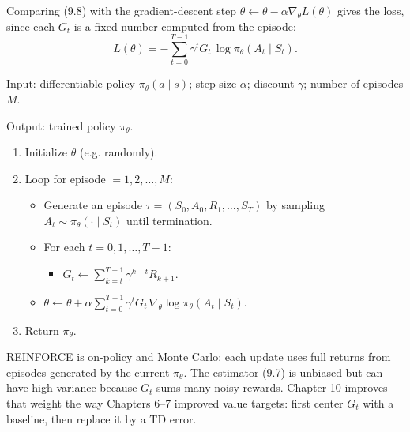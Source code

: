 Comparing (9.8) with the gradient-descent step $\theta\leftarrow\theta-\alpha\nabla_\theta L(\theta)$ gives the loss, since each $G_t$ is a fixed number computed from the episode: \begin{equation}
L(\theta)
=
-\sum_{t=0}^{T-1}
\gamma^{t}G_t\,\log\pi_\theta(A_t\mid S_t).
\tag{9.9}
\end{equation}

\begin{implnote}
Input: differentiable policy $\pi_\theta(a\mid s)$; step size $\alpha$; discount $\gamma$; number of episodes $M$.

Output: trained policy $\pi_\theta$.

\begin{enumerate}
\item Initialize $\theta$ (e.g. randomly).
\item Loop for episode $=1,2,\ldots,M$:
\begin{itemize}
\item Generate an episode $\tau=(S_0,A_0,R_1,\ldots,S_T)$ by sampling $A_t\sim\pi_\theta(\cdot\mid S_t)$ until termination.
\item For each $t=0,1,\ldots,T-1$:
\begin{itemize}
\item $G_t\leftarrow\sum_{k=t}^{T-1}\gamma^{k-t}R_{k+1}$.
\end{itemize}
\item $\theta\leftarrow\theta+\alpha\sum_{t=0}^{T-1}\gamma^{t}G_t\,\nabla_\theta\log\pi_\theta(A_t\mid S_t)$.
\end{itemize}
\item Return $\pi_\theta$.
\end{enumerate}

\end{implnote}




REINFORCE is on-policy and Monte Carlo: each update uses full returns from episodes generated by the current $\pi_\theta$. The estimator (9.7) is unbiased but can have high variance because $G_t$ sums many noisy rewards. Chapter 10 improves that weight the way Chapters 6--7 improved value targets: first center $G_t$ with a baseline, then replace it by a TD error.
